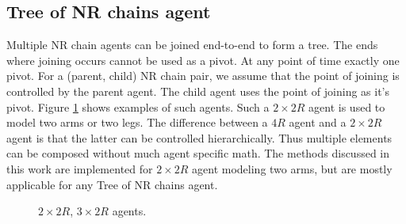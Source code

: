 \documentclass[12pt]{article}
\begin{document}
\subsection{Tree of NR chains agent}
Multiple NR chain agents can be joined end-to-end to form a tree.
The ends where joining occurs cannot be used as a pivot.
At any point of time exactly one pivot.
For a (parent, child) NR chain pair, we assume that the point of joining is controlled by the parent agent.
The child agent uses the point of joining as it's pivot.
Figure \ref{fig:2} shows examples of such agents.
Such a $2 \times 2R$ agent is used to model two arms or two legs.
The difference between a $4R$ agent and a $2 \times 2R$ agent is that the latter can be controlled hierarchically.
Thus multiple elements can be composed without much agent specific math.
The methods discussed in this work are implemented for $2 \times 2R$ agent modeling two arms, but are mostly applicable for any Tree of NR chains agent.
\begin{figure}[h!]
    \centering
    \caption{$2 \times 2R$, $3 \times 2R$ agents.}
    \label{fig:2}
\end{figure}
\end{document}

